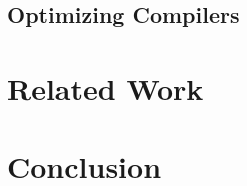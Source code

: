 \documentclass[acmsmall,review,screen,dvipsnames]{acmart}
\begin{document}
\subsection{Optimizing Compilers}\label{subsec:cs:opts}



\section{Related Work}\label{sec:relwork}
\section{Conclusion}\label{sec:concl}


\begin{acks}
\end{acks}




\appendix
\end{document}
